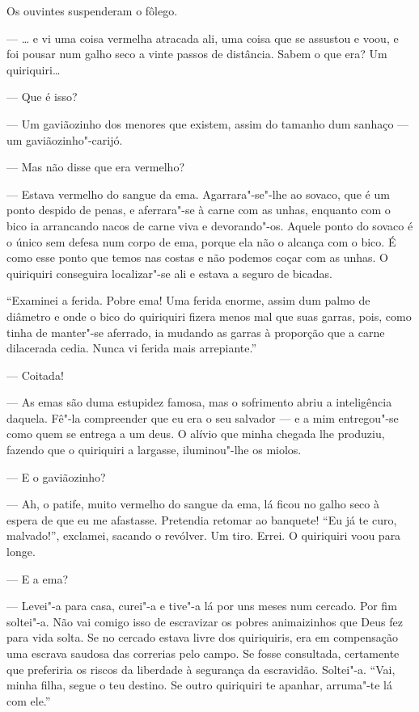 Os ouvintes suspenderam o fôlego.

--- \ldots{} e vi uma coisa vermelha atracada ali, uma coisa que se assustou
e voou, e foi pousar num galho seco a vinte passos de distância. Sabem o
que era? Um quiriquiri\ldots{}

--- Que é isso?

--- Um gaviãozinho dos menores que existem, assim do tamanho dum sanhaço
--- um gaviãozinho"-carijó.

--- Mas não disse que era vermelho?

--- Estava vermelho do sangue da ema. Agarrara"-se"-lhe ao sovaco, que é
um ponto despido de penas, e aferrara"-se à carne com as unhas, enquanto
com o bico ia arrancando nacos de carne viva e devorando"-os. Aquele
ponto do sovaco é o único sem defesa num corpo de ema, porque ela não o
alcança com o bico. É como esse ponto que temos nas costas e não podemos
coçar com as unhas. O quiriquiri conseguira localizar"-se ali e estava a
seguro de bicadas.

``Examinei a ferida. Pobre ema! Uma ferida enorme, assim dum palmo de
diâmetro e onde o bico do quiriquiri fizera menos mal que suas garras,
pois, como tinha de manter"-se aferrado, ia mudando as garras à proporção
que a carne dilacerada cedia. Nunca vi ferida mais arrepiante.''

--- Coitada!

--- As emas são duma estupidez famosa, mas o sofrimento abriu a
inteligência daquela. Fê"-la compreender que eu era o seu salvador --- e
a mim entregou"-se como quem se entrega a um deus. O alívio que minha
chegada lhe produziu, fazendo que o quiriquiri a largasse, iluminou"-lhe
os miolos.

--- E o gaviãozinho?

--- Ah, o patife, muito vermelho do sangue da ema, lá ficou no galho
seco à espera de que eu me afastasse. Pretendia retomar ao banquete!
``Eu já te curo, malvado!'', exclamei, sacando o revólver. Um tiro.
Errei. O quiriquiri voou para longe.

--- E a ema?

--- Levei"-a para casa, curei"-a e tive"-a lá por uns meses num cercado.
Por fim soltei"-a. Não vai comigo isso de escravizar os pobres
animaizinhos que Deus fez para vida solta. Se no cercado estava livre
dos quiriquiris, era em compensação uma escrava saudosa das correrias
pelo campo. Se fosse consultada, certamente que preferiria os riscos da
liberdade à segurança da escravidão. Soltei"-a. ``Vai, minha filha, segue
o teu destino. Se outro quiriquiri te apanhar, arruma"-te lá com ele.''

